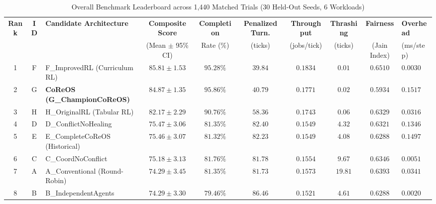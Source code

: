 \documentclass[conference]{IEEEtran}
\begin{document}
\begin{table}[!t]
\caption{Overall Benchmark Leaderboard across 1,440 Matched Trials (30 Held-Out Seeds, 6 Workloads)}
\label{tab:overall_ranking}
\centering
\footnotesize
\begin{tabularx}{\textwidth}{cclccccccX}
\toprule
\textbf{Rank} & \textbf{ID} & \textbf{Candidate Architecture} & \textbf{Composite Score} & \textbf{Completion} & \textbf{Penalized Turn.} & \textbf{Throughput} & \textbf{Thrashing} & \textbf{Fairness} & \textbf{Overhead} \\
& & & (Mean $\pm$ 95\% CI) & Rate (\%) & (ticks) & (jobs/tick) & (ticks) & (Jain Index) & (ms/step) \\
\midrule
1 & F & F\_ImprovedRL (Curriculum RL) & $85.81 \pm 1.53$ & $95.28\%$ & $39.84$ & $0.1834$ & $\mathbf{0.01}$ & $\mathbf{0.6510}$ & $\mathbf{0.0030}$ \\
2 & G & \textbf{CoReOS (G\_ChampionCoReOS)} & $\mathbf{84.87 \pm 1.35}$ & $\mathbf{95.86\%}$ & $\mathbf{40.79}$ & $\mathbf{0.1771}$ & $\mathbf{0.02}$ & $\mathbf{0.5934}$ & $\mathbf{0.1517}$ \\
3 & H & H\_OriginalRL (Tabular RL) & $82.17 \pm 2.29$ & $90.76\%$ & $58.36$ & $0.1743$ & $0.06$ & $0.6329$ & $0.0316$ \\
4 & D & D\_ConflictNoHealing & $75.47 \pm 3.06$ & $81.35\%$ & $82.40$ & $0.1549$ & $4.32$ & $0.6321$ & $0.1346$ \\
5 & E & E\_CompleteCoReOS (Historical) & $75.46 \pm 3.07$ & $81.32\%$ & $82.23$ & $0.1549$ & $4.08$ & $0.6288$ & $0.1497$ \\
6 & C & C\_CoordNoConflict & $75.18 \pm 3.13$ & $81.76\%$ & $81.78$ & $0.1554$ & $9.67$ & $0.6346$ & $0.0051$ \\
7 & A & A\_Conventional (Round-Robin) & $74.29 \pm 3.45$ & $81.35\%$ & $81.73$ & $0.1573$ & $19.81$ & $0.6393$ & $0.0341$ \\
8 & B & B\_IndependentAgents & $74.29 \pm 3.30$ & $79.46\%$ & $86.46$ & $0.1521$ & $4.61$ & $0.6288$ & $0.0020$ \\
\bottomrule
\end{tabularx}
\end{table}
\end{document}
